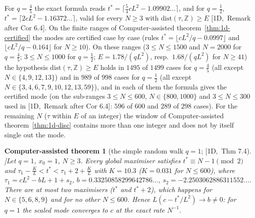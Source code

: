 \documentclass[10pt,a4paper]{article}
\theoremstyle{plain}
\newtheorem{catheorem}[theorem]{Computer-assisted theorem}
\theoremstyle{definition}
\newcommand{\src}[2]{[\textsf{#1},~#2]}           %
\newcommand{\ONE}{\textsf{1D}}
\newcommand{\Z}{\mathbb{Z}}
\begin{document}
For $q=\frac45$ the exact formula reads $t^*=\lceil\frac54cL^2-1.09902\ldots\rceil$, and for $q=\frac12$, $t^*=\lceil2cL^2-1.16372\ldots\rceil$, valid for every $N\ge3$ with $\mathrm{dist}(\tau,\Z)\ge E$ \src{\ONE}{Remark after Cor 6.4}. On the finite ranges of Computer-assisted theorem~\ref{thm:1d-certified} the modes are certified case by case (rules $t^*=\lfloor cL^2/q-0.0997\rfloor$ and $\lfloor cL^2/q-0.164\rfloor$ for $N\ge10$). On these ranges ($3\le N\le1500$ and $N=2000$ for $q=\frac45$; $3\le N\le1000$ for $q=\frac12$; $E=1.78/(qL^2)$, resp.\ $1.68/(qL^2)$ for $N\ge41$) the hypothesis $\mathrm{dist}(\tau,\Z)\ge E$ holds in $1495$ of $1499$ cases for $q=\frac45$ (all except $N\in\{4,9,12,13\}$) and in $989$ of $998$ cases for $q=\frac12$ (all except $N\in\{3,4,6,7,9,10,12,13,59\}$), and in each of them the formula gives the certified mode (on the sub-ranges $3\le N\le600$, $N\in\{800,1000\}$ and $3\le N\le300$ used in \src{\ONE}{Remark after Cor 6.4}: $596$ of $600$ and $289$ of $298$ cases). For the remaining $N$ ($\tau$ within $E$ of an integer) the window of Computer-assisted theorem~\ref{thm:1d-disc} contains more than one integer and does not by itself single out the mode.

\begin{catheorem}[the simple random walk $q=1$; \src{\ONE}{Thm 7.4}]\label{thm:1d-q1}
Let $q=1$, $x_0=1$, $N\ge3$. Every global maximiser satisfies $t^*\equiv N-1\pmod2$ and $\tau_1-\frac KL<t^*<\tau_1+2+\frac KL$ with $K=10.3$ ($K=0.031$ for $N\le600$), where $\tau_1=cL^2-bL+1+s_2$, $b=0.33250858299642786\ldots$, $s_2=-2.2503062886311552\ldots$. There are at most two maximisers ($t^*$ and $t^*+2$), which happens for $N\in\{5,6,8,9\}$ and for no other $N\le600$. Hence $L(c-t^*/L^2)\to b\ne0$: for $q=1$ the scaled mode converges to $c$ at the exact rate $N^{-1}$.
\end{catheorem}
\end{document}
